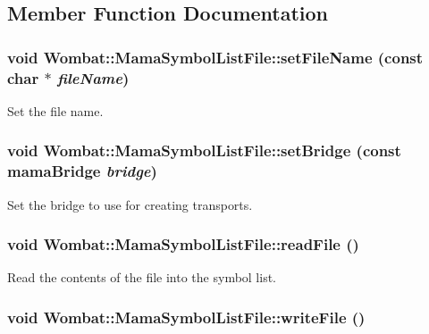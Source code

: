 \subsection{Member Function Documentation}
\hypertarget{classWombat_1_1MamaSymbolListFile_a2afcbdf48cf712c353e5038b0a64adf4}{
\subsubsection[{setFileName}]{\setlength{\rightskip}{0pt plus 5cm}void Wombat::MamaSymbolListFile::setFileName (const char $\ast$ {\em fileName})}}
\label{classWombat_1_1MamaSymbolListFile_a2afcbdf48cf712c353e5038b0a64adf4}


Set the file name. \hypertarget{classWombat_1_1MamaSymbolListFile_a65239fe8a33d5754be76c26336256bed}{
\subsubsection[{setBridge}]{\setlength{\rightskip}{0pt plus 5cm}void Wombat::MamaSymbolListFile::setBridge (const mamaBridge {\em bridge})}}
\label{classWombat_1_1MamaSymbolListFile_a65239fe8a33d5754be76c26336256bed}


Set the bridge to use for creating transports. \hypertarget{classWombat_1_1MamaSymbolListFile_af0144c24817648b3caf0409b40dfea42}{
\subsubsection[{readFile}]{\setlength{\rightskip}{0pt plus 5cm}void Wombat::MamaSymbolListFile::readFile ()}}
\label{classWombat_1_1MamaSymbolListFile_af0144c24817648b3caf0409b40dfea42}


Read the contents of the file into the symbol list. \hypertarget{classWombat_1_1MamaSymbolListFile_a2823b1965b599a8f2d804d951ed255f4}{
\subsubsection[{writeFile}]{\setlength{\rightskip}{0pt plus 5cm}void Wombat::MamaSymbolListFile::writeFile ()}}
\label{classWombat_1_1MamaSymbolListFile_a2823b1965b599a8f2d804d951ed255f4}


